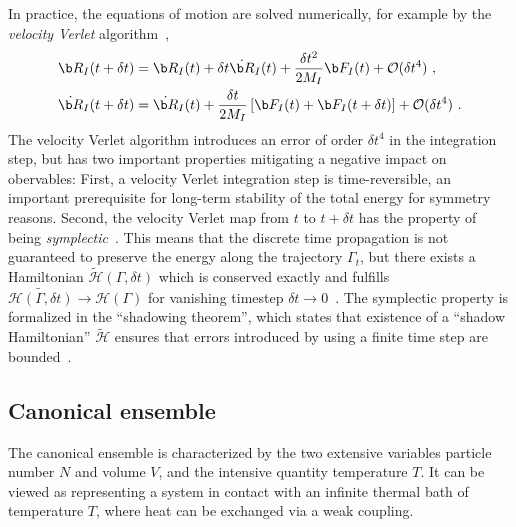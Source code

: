 In practice, the equations of motion are solved numerically, for example by the \emph{velocity Verlet} algorithm~\cite{Verlet1967},
\begin{subequations}
\begin{align}
	\b R_I (t + \delta t) 
		&= \b R_I (t) + \delta t \dot{\b R}_I (t) + \frac{\delta t^2}{2 M_I} \b F_I(t) + \mathcal{O} (\delta t^4)~, \\
	\dot{\b R}_I (t + \delta t) 
		&= \dot{\b R}_I (t) + \frac{\delta t}{2 M_I} \left[\b F_I(t) + \b F_I (t + \delta t)\right] + \mathcal{O} (\delta t^4)~.
\end{align}
\label{eq:VelocityVerlet}
\end{subequations}
The velocity Verlet algorithm introduces an error of order $\delta t^4$ in the integration step, but has two important properties mitigating a negative impact on obervables: First, a velocity Verlet integration step is time-reversible, an important prerequisite for long-term stability of the total energy for symmetry reasons. Second, the velocity Verlet map from $t$ to $t + \delta t$ has the property of being \emph{symplectic}~\cite[p.\,101]{Tuckerman}. This means that the discrete time propagation is not guaranteed to preserve the energy along the trajectory $\Gamma_t$, but there exists a Hamiltonian $\tilde{\mathcal H} (\Gamma, \delta t)$ which is conserved exactly and fulfills $\tilde{\mathcal H (\Gamma, \delta t)} \to \mathcal H(\Gamma)$ for vanishing timestep $\delta t \to 0$~\cite[p.\,121]{Tuckerman}. The symplectic property is formalized in the ``shadowing theorem'', which states that existence of a ``shadow Hamiltonian'' $\tilde{\mathcal H}$ ensures that errors introduced by using a finite time step are bounded~\cite[p.
,120]{Tuckerman}.

\subsection{Canonical ensemble}
The canonical ensemble is characterized by the two extensive variables particle number $N$ and volume $V$, and the intensive quantity temperature $T$. It can be viewed as representing a system in contact with an infinite thermal bath of temperature $T$, where heat can be exchanged via a weak coupling.

